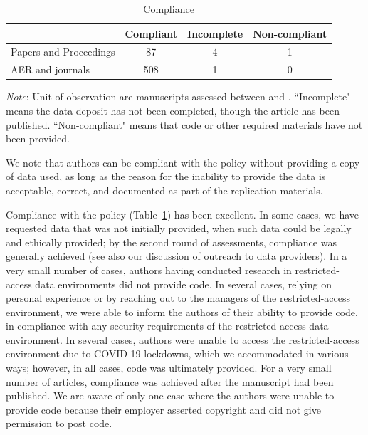 \documentclass[PP]{AEA}
\begin{document}
\begin{table}[t]
    \centering
    \caption{Compliance}
    \label{tab:compliance}
    \begin{threeparttable}
    \begin{tabular}{lccc}
    \toprule
         & Compliant & Incomplete & Non-compliant \\
    \midrule
    Papers and Proceedings &  87    &  4 & 1\\
    AER and journals       & 508  &  1  & 0\\
    \bottomrule
    \end{tabular}
    \begin{tablenotes}
    \footnotesize
    \item[] \textit{Note}: Unit of observation are manuscripts assessed between \firstday{} and \lastday{}. ``Incomplete" means the data deposit has not been completed, though the article has been published. ``Non-compliant" means that code or other required materials have not been provided.
    \end{tablenotes}
    \end{threeparttable}
\end{table}


We note that authors can be compliant with the policy without providing a copy of data used, as long as the reason for the inability to provide the data is acceptable, correct, and documented as part of the replication materials. 

Compliance with the policy (Table~\ref{tab:compliance}) has been excellent. In some cases, we have requested data that was not initially provided, when such data could be legally and ethically provided; by the second round of assessments, compliance was generally achieved (see also our discussion of outreach to data providers). In a very small number of cases, authors having conducted research in restricted-access data environments did not provide code. In several cases, relying on personal experience or by reaching out to the managers of the restricted-access environment, we were able to inform the authors of their ability to provide code, in compliance with any security requirements of the restricted-access data environment. In several cases, authors were unable to access the restricted-access environment due to COVID-19 lockdowns, which we accommodated in various ways; however, in all cases, code was ultimately provided. For a very small number of articles, compliance was achieved after the manuscript had been published. We are aware of only one case where the authors were unable to provide code because their employer asserted copyright and did not give permission to post code. 
\end{document}
